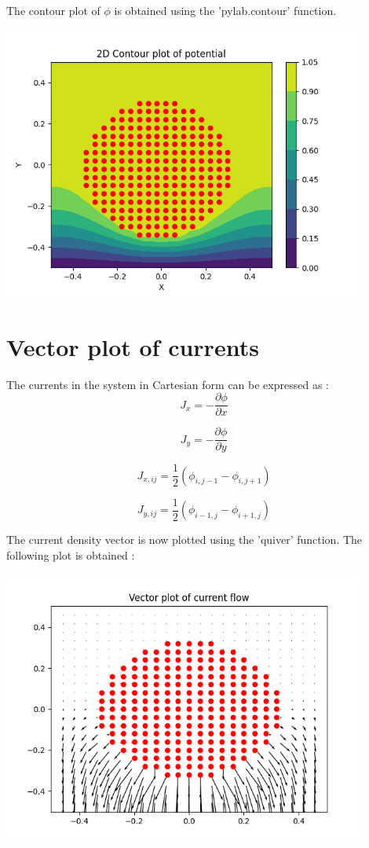 \documentclass[10pt,a4paper]{article}
\begin{document}
The contour plot of $\phi$ is obtained using the 'pylab.contour' function.

\includegraphics[width = 0.9\textwidth]{7.png}

 \section{Vector plot of currents}

 The currents in the system in Cartesian form can be expressed as :
\begin{equation}
 J_x = -\frac{\partial \phi}{\partial x} 
\end{equation}

\begin{equation}
 J_y = -\frac{\partial \phi}{\partial y} 
\end{equation}
 
 \begin{equation}
 J_{x,ij} = \frac{1}{2}(\phi_{i,j-1} - \phi_{i,j+1}) 
 \end{equation}

\begin{equation}
 J_{y,ij} = \frac{1}{2}(\phi_{i-1,j} - \phi_{i+1,j}) 
\end{equation}

The current density vector is now plotted using the 'quiver'  function. The following plot is obtained :

\includegraphics[width = 0.9\textwidth]{8.png}
\end{document}
